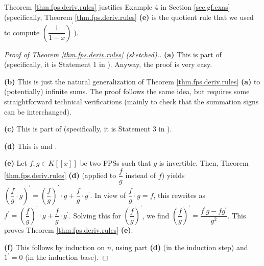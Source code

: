 Theorem \ref{thm.fps.deriv.rules} justifies Example 4 in Section
\ref{sec.gf.exas} (specifically, Theorem \ref{thm.fps.deriv.rules}
\textbf{(e)} is the quotient rule that we used to compute $\left(  \dfrac
{1}{1-x}\right)  ^{\prime}$).

\begin{proof}
[Proof of Theorem \ref{thm.fps.deriv.rules} (sketched).]\textbf{(a)} This is
part of \cite[Exercise 5 \textbf{(b)}]{19s-mt3s} (specifically, it is
Statement 1 in \cite[solution to Exercise 5 \textbf{(b)}]{19s-mt3s}). Anyway,
the proof is very easy. \medskip

\textbf{(b)} This is just the natural generalization of Theorem
\ref{thm.fps.deriv.rules} \textbf{(a)} to (potentially) infinite sums. The
proof follows the same idea, but requires some straightforward technical
verifications (mainly to check that the summation signs can be interchanged).
\medskip

\textbf{(c)} This is part of \cite[Exercise 5 \textbf{(b)}]{19s-mt3s}
(specifically, it is Statement 3 in \cite[solution to Exercise 5 \textbf{(b)}%
]{19s-mt3s}). \medskip

\textbf{(d)} This is \cite[Exercise 5 \textbf{(c)}]{19s-mt3s} and
\cite[Proposition 0.2 \textbf{(c)}]{logexp}. \medskip

\textbf{(e)} Let $f,g\in K\left[  \left[  x\right]  \right]  $ be two FPSs
such that $g$ is invertible. Then, Theorem \ref{thm.fps.deriv.rules}
\textbf{(d)} (applied to $\dfrac{f}{g}$ instead of $f$) yields $\left(
\dfrac{f}{g}\cdot g\right)  ^{\prime}=\left(  \dfrac{f}{g}\right)  ^{\prime
}\cdot g+\dfrac{f}{g}\cdot g^{\prime}$. In view of $\dfrac{f}{g}\cdot g=f$,
this rewrites as $f^{\prime}=\left(  \dfrac{f}{g}\right)  ^{\prime}\cdot
g+\dfrac{f}{g}\cdot g^{\prime}$. Solving this for $\left(  \dfrac{f}%
{g}\right)  ^{\prime}$, we find $\left(  \dfrac{f}{g}\right)  ^{\prime}%
=\dfrac{f^{\prime}g-fg^{\prime}}{g^{2}}$. This proves Theorem
\ref{thm.fps.deriv.rules} \textbf{(e)}. \medskip

\textbf{(f)} This follows by induction on $n$, using part \textbf{(d)} (in the
induction step) and $1^{\prime}=0$ (in the induction base). \medskip


\end{proof}
